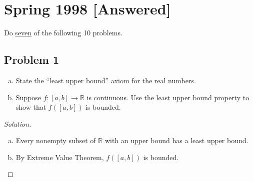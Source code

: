 \documentclass[12pt]{article}
\newcommand{\real}{\mathbb{R}}
\newcommand\paren[1]{\left( #1 \right)}
\theoremstyle{definition}
\begin{document}
\section{Spring 1998 [Answered]}
Do \underline{seven} of the following 10 problems.
\subsection{Problem 1}
\begin{enumerate}[a)]
    \item State the ``least upper bound'' axiom for the real numbers.
    \item Suppose $f : [a,b] \to \real$ is continuous. Use the least upper bound property to show that $f \paren{ [a,b] }$ is bounded.
\end{enumerate}
\begin{proof}[Solution]
    \noindent
    \begin{enumerate}[a)]
        \item Every nonempty subset of $\real$ with an upper bound has a least upper bound.
        \item By Extreme Value Theorem, $f \paren{ [a,b] }$ is bounded.
    \end{enumerate}
\end{proof}
\end{document}
